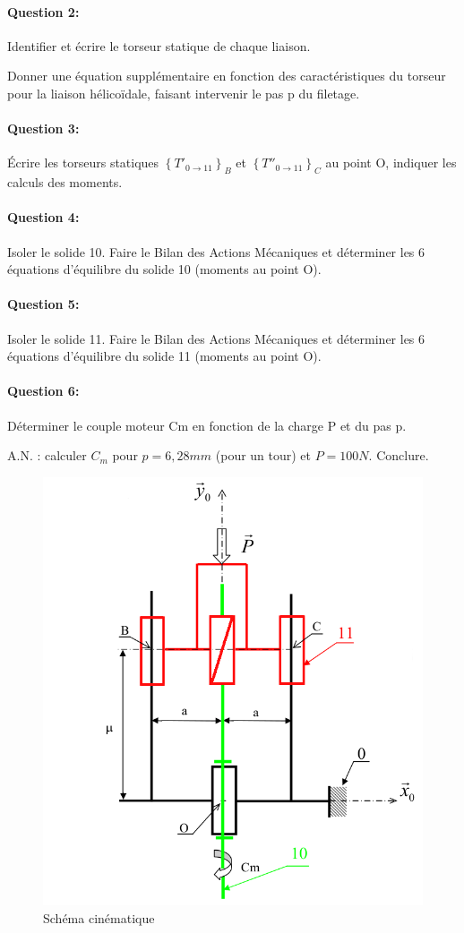 \paragraph{Question 2:} Identifier et écrire le torseur statique de chaque liaison.

Donner une équation supplémentaire en fonction des caractéristiques du torseur pour la liaison hélicoïdale, faisant intervenir le pas p du filetage.

\paragraph{Question 3:} Écrire les torseurs statiques $\left\{T'_{0 \rightarrow 11}\right\}_B$ et $\left\{T''_{0 \rightarrow 11}\right\}_C$ au point O, indiquer les calculs des moments.

\paragraph{Question 4:} Isoler le solide 10. Faire le Bilan des Actions Mécaniques et déterminer les 6 équations d'équilibre du solide 10 (moments au point O).

\paragraph{Question 5:} Isoler le solide 11. Faire le Bilan des Actions Mécaniques et déterminer les 6 équations d'équilibre du solide 11 (moments au point O).

\paragraph{Question 6:} Déterminer le couple moteur Cm en fonction de la charge P et du pas p.

A.N. : calculer $C_m$ pour $p = 6,28 mm$ (pour un tour) et $P = 100 N$. Conclure.

\begin{figure}[!h]
  \centering\includegraphics[width=0.6\linewidth]{img/colleuse_cin.png}
  \caption{Schéma cinématique}
  \label{img2}
\end{figure}

